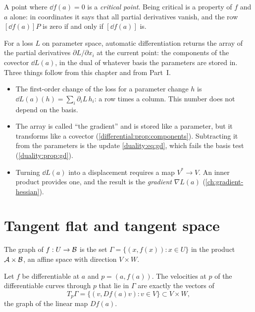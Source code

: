 \begin{notechapter}
A point where $\dd f(a) = 0$ is a \emph{critical point}. Being critical is
a property of $f$ and $a$ alone: in coordinates it says that all partial
derivatives vanish, and the row $[\dd f(a)]P$ is zero if and only if
$[\dd f(a)]$ is.

\begin{mlthread}
For a loss $L$ on parameter space, automatic differentiation returns the
array of the partial derivatives $\partial L/\partial x_i$ at the current
point: the components of the covector $\dd L(a)$, in the dual of whatever
basis the parameters are stored in. Three things follow from this
chapter and from Part~I.
\begin{itemize}[nosep]
  \item The first-order change of the loss for a parameter change $h$ is
        $\dd L(a)(h) = \sum_i\partial_iL\,h_i$: a row times a column. This
        number does not depend on the basis.
  \item The array is called ``the gradient'' and is stored like a
        parameter, but it transforms like a covector
        (\cref{differential:prop:components}). Subtracting it from the
        parameters is the update \eqref{duality:eq:gd}, which fails the
        basis test (\cref{duality:prop:gd}).
  \item Turning $\dd L(a)$ into a displacement requires a map
        $V^*\to V$. An inner product provides one, and the result is the
        \emph{gradient} $\nabla L(a)$ (\cref{ch:gradient-hessian}).
\end{itemize}
\end{mlthread}

\section{Tangent flat and tangent space}\label{differential:sec:flat}

The graph of $f:U\to\mathcal{B}$ is the set
$\Gamma = \{(x, f(x)) : x\in U\}$ in the product $\mathcal{A}\times\mathcal{B}$, an
affine space with direction $V\times W$.

\begin{proposition}\label{differential:prop:graph}
Let $f$ be differentiable at $a$ and $p = (a, f(a))$. The velocities at
$p$ of the differentiable curves through $p$ that lie in $\Gamma$ are
exactly the vectors of
\[
  T_p\Gamma = \{(v, Df(a)v) : v\in V\}\subset V\times W ,
\]
the graph of the linear map $Df(a)$.
\end{proposition}


\end{notechapter}
